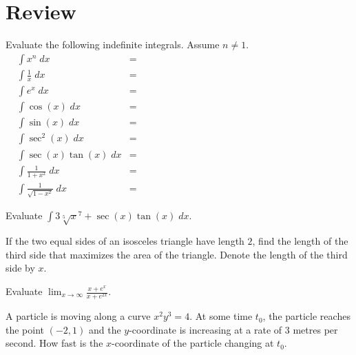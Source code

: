 \documentclass[../main.tex]{subfiles}
\begin{document}

\clearpage
\section{Review}
\begin{example}
  Evaluate the following indefinite integrals. Assume \(n \ne 1\).
  \vspace{2cm}
  \begin{align*}
    &\int x^{n} \;dx &=& \hspace{4in} \\
    &\int \frac{1}{x} \;dx &=& \hspace{4in}\\
    &\int e^{x} \;dx &=& \hspace{4in}\\
    &\int \cos(x) \;dx &=& \hspace{4in}\\
    &\int \sin(x) \;dx &=& \hspace{4in}\\
    &\int \sec^{2}(x) \;dx &=& \hspace{4in}\\
    &\int \sec(x)\tan(x) \;dx &=& \hspace{4in}\\
    &\int \frac{1}{1 + x^{2}} \;dx &=& \hspace{4in} \\
    &\int \frac{1}{\sqrt{1 - x^{2}}} \;dx &=& \hspace{4in}
  \end{align*}
\end{example}

\begin{example}
  Evaluate \(\int 3 \sqrt[5]{x}^{7} + \sec(x)\tan(x) \;dx\).
\end{example}
\clearpage

\begin{example}
  If the two equal sides of an isosceles triangle have length \(2\), find the length of the third side that maximizes the area of the triangle. Denote the length of the third side by \(x\).
\end{example}
\clearpage

\begin{example}
  Evaluate \(\lim_{x \to \infty} \frac{x + e^{x}}{x + e^{2x}}\).
\end{example}
\clearpage

\begin{example}
  A particle is moving along a curve \(x^{2}y^{3} = 4\). At some time \(t_{0}\), the particle reaches the point \((-2,1)\) and the \(y\)-coordinate is increasing at a rate of \(3\) metres per second. How fast is the \(x\)-coordinate of the  particle changing at \(t_{0}\).
\end{example}
\end{document}
